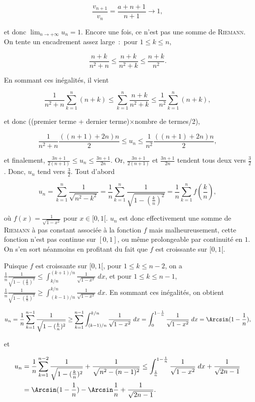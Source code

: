 {{$$\frac{v_{n+1}}{v_n}=\frac{a+n+1}{n+1}\rightarrow1,$$

et donc $\lim_{n\rightarrow +\infty}u_n=1$.
Encore une fois, ce n'est pas une somme de \textsc{Riemann}. On tente un encadrement assez large~:~pour $1\leq k\leq n$, 

$$\frac{n+k}{n^2+n}\leq\frac{n+k}{n^2+k}\leq\frac{n+k}{n^2}.$$

En sommant ces inégalités, il vient 

$$\frac{1}{n^2+n}\sum_{k=1}^{n}(n+k)\leq\sum_{k=1}^{n}\frac{n+k}{n^2+k}\leq\frac{1}{n^2}\sum_{k=1}^{n}(n+k),$$

et donc ((premier terme + dernier terme)$\times$nombre de termes/2),

$$\frac{1}{n^2+n}\frac{((n+1)+2n)n}{2}\leq u_n\leq\frac{1}{n^2}\frac{((n+1)+2n)n}{2},$$

et finalement, $\frac{3n+1}{2(n+1)}\leq u_n\leq\frac{3n+1}{2n}$. Or, $\frac{3n+1}{2(n+1)}$ et $\frac{3n+1}{2n}$ tendent tous deux vers $\frac{3}{2}$. Donc, $u_n$ tend vers $\frac{3}{2}$.
Tout d'abord

$$u_n=\sum_{k=1}^{n}\frac{1}{\sqrt{n^2-k^2}}=\frac{1}{n}\sum_{k=1}^{n}\frac{1}{\sqrt{1-(\frac{k}{n})^2}}=
\frac{1}{n}\sum_{k=1}^{n}f(\frac{k}{n}),$$ 

où $f(x)=\frac{1}{\sqrt{1-x^2}}$ pour $x\in[0,1[$. $u_n$ est donc effectivement une somme de \textsc{Riemann} à pas constant associée à la fonction $f$ mais malheureusement, cette fonction n'est pas continue sur $[0,1]$, ou même prolongeable par continuité en $1$. On s'en sort néanmoins en profitant du fait que $f$ est croissante sur $[0,1[$.

Puisque $f$ est croissante sur $[0,1[$, pour $1\leq k\leq n-2$, on a $\frac{1}{n}\frac{1}{\sqrt{1-(\frac{k}{n})^2}}\leq\int_{k/n}^{(k+1)/n}\frac{1}{\sqrt{1-x^2}}\;dx$, et pour $1\leq k\leq n-1$, $\frac{1}{n}\frac{1}{\sqrt{1-(\frac{k}{n})^2}}\geq\int_{(k-1)/n}^{k/n}\frac{1}{\sqrt{1-x^2}}\;dx$. En sommant ces inégalités, on obtient

$$u_n=\frac{1}{n}\sum_{k=1}^{n-1}\frac{1}{\sqrt{1-(\frac{k}{n})^2}}\geq\sum_{k=1}^{n-1}\int_{(k-1)/n}^{k/n}\frac{1}{\sqrt{1-x^2}}\;dx=\int_{0}^{1-\frac{1}{n}}\frac{1}{\sqrt{1-x^2}}\;dx=\Arcsin(1-\frac{1}{n}),$$

et 

\begin{align*}\ensuremath
u_n&=\frac{1}{n}\sum_{k=1}^{n-2}\frac{1}{\sqrt{1-(\frac{k}{n})^2}}+\frac{1}{\sqrt{n^2-(n-1)^2}}\leq\int_{\frac{1}{n}}^{1-\frac{1}{n}}\frac{1}{\sqrt{1-x^2}}\;dx+\frac{1}{\sqrt{2n-1}}\\
 &=\Arcsin(1-\frac{1}{n})-\Arcsin\frac{1}{n}+\frac{1}{\sqrt{2n-1}}.
\end{align*}

}}
